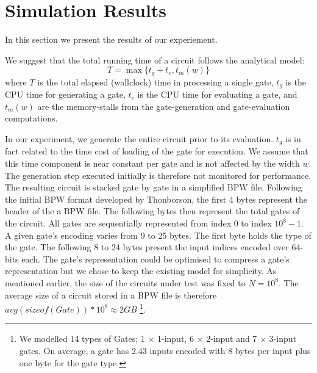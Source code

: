 \section{Simulation Results}
In this section we present the results of our experiement.
\par
We suggest that the total running time of a circuit follows the analytical model:
\begin{equation}
T = \max\{ t_g + t_e, t_m(w) \}
\end{equation}
where $T$ is the total elapsed (wallclock) time in processing a single gate, $t_g$ is the CPU time for generating a gate, $t_e$ is the CPU time for evaluating a gate, and $t_m(w)$ are the memory-stalls from the gate-generation and gate-evaluation computations.
\par
In our experiment, we generate the entire circuit prior to its evaluation. $t_g$ is in fact related to the time cost of loading of the gate for execution. We assume that this time component is near constant per gate and is not affected by the width $w$. The generation step executed initially is therefore not monitored for performance. The resulting circuit is stacked gate by gate in a simplified BPW file. Following the initial BPW format developed by Thonborson, the first 4 bytes represent the header of the a BPW file\cite{clark}. The following bytes then represent the total gates of the circuit. All gates are sequentially represented from index $0$ to index $10^8-1$. A given gate's encoding varies from 9 to 25 bytes. The first byte holds the type of the gate. The following 8 to 24 bytes present the input indices encoded over 64-bits each. The gate’s representation could be optimised to compress a gate’s representation but we chose to keep the existing model for simplicity. As mentioned earlier, the size of the circuits under test was fixed to $N = 10^8$. The average size of a circuit stored in a BPW file is therefore $avg(sizeof(Gate)) * 10^8 \approx 2 GB$ \footnote{We modelled 14 types of Gates; 1 $\times$ 1-input, 6 $\times$ 2-input and 7 $\times$ 3-input gates. On average, a gate has 2.43 inputs encoded with 8 bytes per input plus one byte for the gate type.}.

